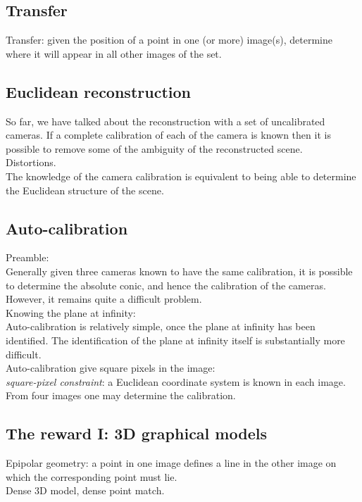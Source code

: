 \documentclass[12pt]{article}
\begin{document}
\subsection{Transfer}
Transfer: given the position of a point in one (or more) image(s), determine where it will
appear in all other images of the set. \\

\subsection{Euclidean reconstruction}
So far, we have talked about the reconstruction with a set of uncalibrated cameras. If a complete calibration of each
of the camera is known then it is possible to remove some of the ambiguity of the reconstructed scene. \\
Distortions. \\
The knowledge of the camera calibration is equivalent to being able to determine the Euclidean structure of the scene. \\

\subsection{Auto-calibration}
Preamble: \\
Generally given three cameras known to have the same calibration, it is possible to determine the
absolute conic, and hence the calibration of the cameras. However, it remains quite a difficult problem. \\

\noindent Knowing the plane at infinity: \\
Auto-calibration is relatively simple, once the plane at infinity has been identified. 
The identification of the plane at infinity itself is substantially more difficult. \\

\noindent Auto-calibration give square pixels in the image: \\
\textit{square-pixel constraint}: a Euclidean coordinate system is known in each image. \\
From four images one may determine the calibration. \\

\subsection{The reward \textrm{I}: 3D graphical models}
Epipolar geometry: a point in one image defines a line in the other image on which the 
corresponding point must lie. \\
Dense 3D model, dense point match. \\
\end{document}
